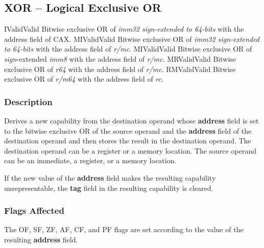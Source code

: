 \clearpage
{}
{}
\subsection*{XOR -- Logical Exclusive OR}

\begin{x86opcodetable}
  {I}{Valid}{Valid}
  {Bitwise exclusive OR of \emph{imm32 sign-extended to 64-bits} with
    the address field of CAX.}
  {MI}{Valid}{Valid}
  {Bitwise exclusive OR of \emph{imm32 sign-extended to 64-bits} with
    the address field of \emph{r/mc}.}
  {MI}{Valid}{Valid}
  {Bitwise exclusive OR of \emph{sign}-extended \emph{imm8} with the
    address field of \emph{r/mc}.}
  {MR}{Valid}{Valid}
  {Bitwise exclusive OR of \emph{r64} with the address field of \emph{r/mc}.}
  {RM}{Valid}{Valid}
  {Bitwise exclusive OR of \emph{r/m64} with the address field of \emph{rc}.}
\end{x86opcodetable}

\begin{x86opentable}
\end{x86opentable}

\subsubsection*{Description}

Derives a new capability from the destination operand whose
\textbf{address} field is set to the bitwise exclusive OR of the
source operand and the \textbf{address} field of the destination
operand and then stores the result in the destination operand. The
destination operand can be a register or a memory location. The source
operand can be an immediate, a register, or a memory location.

If the new value of the \textbf{address} field makes the resulting
capability unrepresentable, the \textbf{tag} field in the resulting
capability is cleared.

\subsubsection*{Flags Affected}

The OF, SF, ZF, AF, CF, and PF flags are set according to the value of
the resulting \textbf{address} field.
